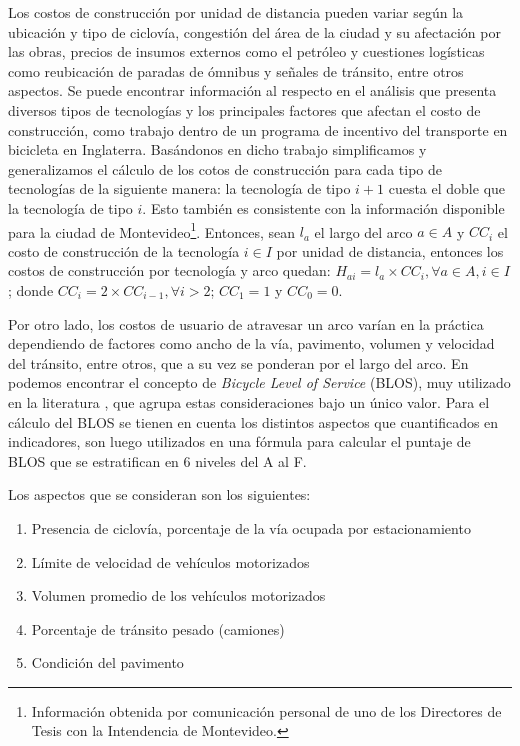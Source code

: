 Los costos de construcción por unidad de distancia pueden variar según la ubicación y tipo de ciclovía, congestión del área de la ciudad y su afectación por las obras, precios de insumos externos como el petróleo y cuestiones logísticas como reubicación de paradas de ómnibus y señales de tránsito, entre otros aspectos. Se puede encontrar información al respecto en el análisis \textcite{typicalcostsofcylcing} que presenta diversos tipos de tecnologías y los principales factores que afectan el costo de construcción, como trabajo dentro de un programa de incentivo del transporte en bicicleta en Inglaterra. Basándonos en dicho trabajo simplificamos y generalizamos el cálculo de los cotos de construcción para cada tipo de tecnologías de la siguiente manera: la tecnología de tipo $i + 1$ cuesta el doble que la tecnología de tipo $i$. Esto también es consistente con la información disponible para la ciudad de Montevideo\footnote{Información obtenida por comunicación personal de uno de los Directores de Tesis con la Intendencia de Montevideo.}. Entonces, sean $l_a$ el largo del arco $a \in A$ y $CC_i$ el costo de construcción de la tecnología $i \in I$ por unidad de distancia, entonces los costos de construcción por tecnología y arco quedan: $H_{ai} = l_a \times CC_i, \forall a \in A, i \in I$; donde $CC_i = 2 \times CC_{i-1}, \forall i > 2$; $CC_1 = 1$ y $CC_0 = 0$.

Por otro lado, los costos de usuario de atravesar un arco varían en la práctica dependiendo de factores como ancho de la vía, pavimento, volumen y velocidad del tránsito, entre otros, que a su vez se ponderan por el largo del arco. En \textcite{blos2007} podemos encontrar el concepto de {\it Bicycle Level of Service} (BLOS), muy utilizado en la literatura \parencite{Zhu2019, Liu2019}, que agrupa estas consideraciones bajo un único valor. Para el cálculo del BLOS se tienen en cuenta los distintos aspectos que cuantificados en indicadores, son luego utilizados en una fórmula para calcular el puntaje de BLOS que se estratifican en 6 niveles del A al F.

Los aspectos que se consideran son los siguientes:

\begin{enumerate}
  \item{Presencia de ciclovía, porcentaje de la vía ocupada por estacionamiento}
  \item{Límite de velocidad de vehículos motorizados}
  \item{Volumen promedio de los vehículos motorizados}
  \item{Porcentaje de tránsito pesado (camiones)}
  \item{Condición del pavimento}
\end{enumerate}

